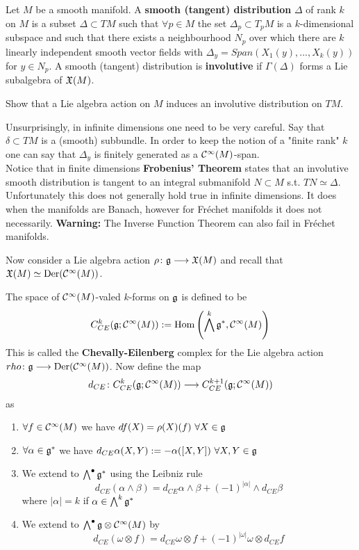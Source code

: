 \begin{definition}
  Let $M$ be a smooth manifold. A \textbf{smooth (tangent) distribution} $\Delta$ of rank $k$ on $M$ is a subset $\Delta \subset TM$ such that $\forall p \in M$ the set $\Delta_p \subset T_p M$ is a $k$-dimensional subspace and such that there exists a neighbourhood $N_p$ over which there are $k$ linearly independent smooth vector fields with $\Delta_y = Span(X_1(y), ..., X_k(y))$ for $y \in N_p$. A smooth (tangent) distribution is \textbf{involutive} if $\Gamma(\Delta)$ forms a Lie subalgebra of $\mathfrak{X}(M)$.
\end{definition}

\begin{ex}
  Show that a Lie algebra action on $M$ induces an involutive distribution on $TM$.
\end{ex}

\begin{rem}
  Unsurprisingly, in infinite dimensions one need to be very careful. Say that $\delta \subset TM$ is a (smooth) subbundle. In order to keep the notion of a "finite rank" $k$ one can say that $\Delta_y$ is finitely generated as a $\mathcal{C}^{\infty}(M)$-span.\\
  Notice that in finite dimensions \textbf{Frobenius' Theorem} states that an involutive smooth distribution is tangent to an integral submanifold $N \subset M$ s.t. $TN \simeq \Delta$. Unfortunately this does not generally hold true in infinite dimensions. It does when the manifolds are Banach, however for Fréchet manifolds it does not necessarily. \textbf{Warning:} The Inverse Function Theorem can also fail in Fréchet manifolds.
\end{rem}

Now consider a Lie algebra action $\rho \colon \mathfrak{g} \longrightarrow \mathfrak{X}(M)$ and recall that $\mathfrak{X}(M) \simeq \operatorname{Der}(\mathcal{C}^{\infty}(M))$.

\begin{definition}
  The space of $\mathcal{C}^{\infty}(M)$-valed $k$-forms on $\mathfrak{g}$ is defined to be
  $$ C^k_{CE}(\mathfrak{g} ; \mathcal{C}^{\infty}(M)) := \operatorname{Hom}\left(\bigwedge^k \mathfrak{g}^*, \mathcal{C}^{\infty}(M)\right) $$
  This is called the \textbf{Chevally-Eilenberg} complex for the Lie algebra action $rho \colon \mathfrak{g} \longrightarrow \operatorname{Der}(\mathcal{C}^{\infty}(M))$. Now define the map
  $$ d_{CE} \colon C^k_{CE}(\mathfrak{g} ; \mathcal{C}^{\infty}(M)) \longrightarrow C^{k+1}_{CE}(\mathfrak{g} ; \mathcal{C}^{\infty}(M)) $$
  as
  \begin{enumerate}
    \item $\forall f\in \mathcal{C}^{\infty}(M)$ we have $df(X)= \rho(X)(f) \ \forall X \in \mathfrak{g}$
    \item $\forall \alpha \in \mathfrak{g}^*$ we have $d_{CE}\alpha(X,Y) := - \alpha([X,Y]) \ \forall X,Y \in \gf$
    \item We extend to $\bigwedge^\bullet \mathfrak{g}^*$ using the Leibniz rule
    $$ d_{CE} (\alpha \wedge \beta) = d_{CE}\alpha \wedge \beta + (-1)^{|\alpha|} \wedge d_{CE} \beta $$
    where $|\alpha| = k$ if $\alpha \in \bigwedge^k\mathfrak{g}^*$
    \item We extend to $\bigwedge^\bullet \mathfrak{g} \otimes \mathcal{C}^{\infty}(M)$ by
    $$ d_{CE}(\omega \otimes f) = d_{CE} \omega \otimes f + (-1)^{|\omega|} \omega \otimes d_{CE} f$$
  \end{enumerate}
\end{definition}

